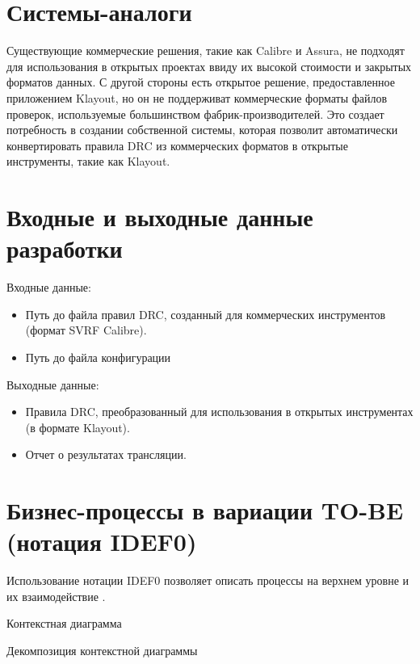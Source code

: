 \section{Системы-аналоги}

Существующие коммерческие решения, такие как Calibre и Assura,
не подходят для использования в открытых проектах ввиду их высокой стоимости
и закрытых форматов данных.
С другой стороны есть открытое решение, предоставленное приложением Klayout,
но он не поддерживат коммерческие форматы файлов проверок,
используемые большинством фабрик-производителей.
Это создает потребность в создании собственной системы,
которая позволит автоматически конвертировать правила DRC
из коммерческих форматов в открытые инструменты, такие как Klayout.


\section{Входные и выходные данные разработки}

Входные данные:

\begin{itemize}
	\item Путь до файла правил DRC,
		созданный для коммерческих инструментов (формат SVRF Calibre).
	\item Путь до файла конфигурации
\end{itemize}

Выходные данные:

\begin{itemize}
	\item Правила DRC, преобразованный для использования
		в открытых инструментах (в формате Klayout).
	\item Отчет о результатах трансляции.
\end{itemize}

\section{Бизнес-процессы в вариации TO-BE (нотация IDEF0)}

Использование нотации IDEF0 позволяет описать процессы на верхнем уровне
и их взаимодействие
.

\begin{image}
	\caption{Контекстная диаграмма}
	\label{fig:idef0}
\end{image}

\begin{image}
	\caption{Декомпозиция контекстной диаграммы}
	\label{fig:idef0:a0}
\end{image}

